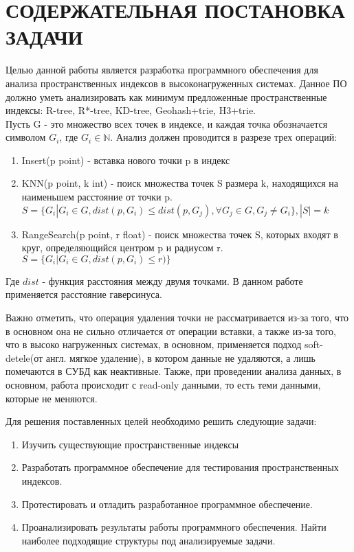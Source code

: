 \chapter{СОДЕРЖАТЕЛЬНАЯ ПОСТАНОВКА ЗАДАЧИ}
\label{cha:statement}

Целью данной работы является разработка программного обеспечения для анализа пространственных индексов в высоконагруженных системах. Данное ПО должно уметь анализировать как минимум предложенные пространственные индексы: R-tree, R*-tree, KD-tree, Geohash+trie, H3+trie.\\
Пусть G - это множество всех точек в индексе, и каждая точка обозначается символом $G_i$, где $G_i \in \mathbb{N}$.
Анализ должен проводится в разрезе трех операций:
\begin{enumerate}
    \item  Insert(p point) - вставка нового точки p в индекс
    \item  KNN(p point, k int) -  поиск множества точек S размера k, находящихся на наименьшем расстояние от точки p. $S=\{G_i | G_i \in G, dist(p, G_i) \leq dist(p, G_j),  \forall G_j \in G, G_j \neq G_i \}, |S| = k$
    \item  RangeSearch(p point, r float) - поиск множества точек S, которых входят в круг, определяющийся центром p и радиусом r. $S=\{G_i | G_i \in G, dist(p, G_i) \leq r)\}$
\end{enumerate}
Где $dist$ - функция расстояния между двумя точками. В данном работе применяется расстояние гаверсинуса. 

Важно отметить, что операция удаления точки не рассматривается из-за того, что в основном она не сильно отличается от операции вставки, а также из-за того, что в высоко нагруженных системах, в основном, применяется подход soft-detele(от англ. мягкое удаление), в котором данные не удаляются, а лишь помечаются в СУБД как неактивные. Также, при проведении анализа данных, в основном, работа происходит с read-only данными, то есть теми данными, которые не меняются. 

Для решения поставленных целей необходимо решить следующие задачи:
\begin{enumerate}
    \item Изучить существующие пространственные индексы
    \item Разработать программное обеспечение для тестирования пространственных индексов.
    \item Протестировать и отладить разработанное программное обеспечение.
    \item Проанализировать результаты работы программного обеспечения. Найти наиболее подходящие структуры под анализируемые задачи.
\end{enumerate}

